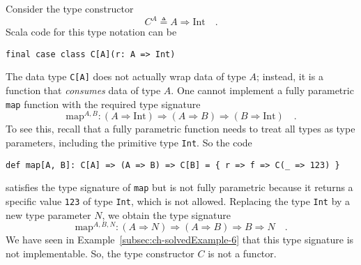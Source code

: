 Consider the type constructor
\[
C^{A}\triangleq A\Rightarrow\text{Int}\quad.
\]
Scala code for this type notation can be
\begin{lstlisting}
final case class C[A](r: A => Int)
\end{lstlisting}
The data type \lstinline!C[A]! does not actually wrap data of type
$A$; instead, it is a function that \emph{consumes} data of type
$A$. One cannot implement a fully parametric \lstinline!map! function
with the required type signature 
\[
\text{map}^{A,B}:\left(A\Rightarrow\text{Int}\right)\Rightarrow\left(A\Rightarrow B\right)\Rightarrow\left(B\Rightarrow\text{Int}\right)\quad.
\]
To see this, recall that a fully
parametric function needs to treat all types as type parameters, including
the primitive type \lstinline!Int!. So the code
\begin{lstlisting}
def map[A, B]: C[A] => (A => B) => C[B] = { r => f => C(_ => 123) }
\end{lstlisting}
satisfies the type signature of \lstinline!map! but is not fully
parametric because it returns a specific value \lstinline!123! of
type \lstinline!Int!, which is not allowed. Replacing the type \lstinline!Int!
by a new type parameter $N$, we obtain the type signature
\[
\text{map}^{A,B,N}:\left(A\Rightarrow N\right)\Rightarrow\left(A\Rightarrow B\right)\Rightarrow B\Rightarrow N\quad.
\]
We have seen in Example~\ref{subsec:ch-solvedExample-6} that this
type signature is not implementable. So, the type constructor $C$
is not a functor.

